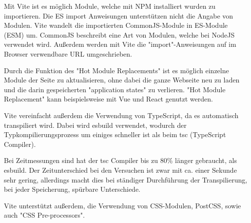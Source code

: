 

Mit Vite ist es möglich Module, welche mit NPM installiert wurden zu importieren. Die ES import Anweisungen unterstützen nicht die Angabe von Modulen. Vite wandelt die importierten CommonJS-Module in ES-Module (ESM) um. CommonJS beschreibt eine Art von Modulen, welche bei NodeJS verwendet wird. Außerdem werden mit Vite die "import"-Anweisungen auf im Browser verwendbare URL umgeschrieben. \cite{ViteFeatures}



Durch die Funktion des "Hot Module Replacements" ist es möglich einzelne Module der Seite zu aktualisieren, ohne dabei die ganze Webseite neu zu laden und die darin gespeicherten "application states" zu verlieren. "Hot Module Replacement" kann beispielsweise mit Vue und React genutzt werden. \cite{ViteFeatures}
  

Vite vereinfacht außerdem die Verwendung von TypeScript, da es automatisch transpiliert wird. Dabei wird esbuild\cite{esbuild} verwendet, wodurch der Typkompilierungsprozess um einiges schneller ist als beim tsc (TypeScript Compiler). \cite{ViteFeatures}

Bei Zeitmessungen sind hat der tsc Compiler bis zu 80\% länger gebraucht, als esbuild. Der Zeitunterschied bei den Versuchen ist zwar mit ca. einer Sekunde sehr gering, allerdings macht dies bei ständiger Durchführung der Transpilierung, bei jeder Speicherung, spürbare Unterschiede.


Vite unterstützt außerdem, die Verwendung von CSS-Modulen, PostCSS, sowie auch "CSS Pre-processors". \cite{ViteFeatures}



